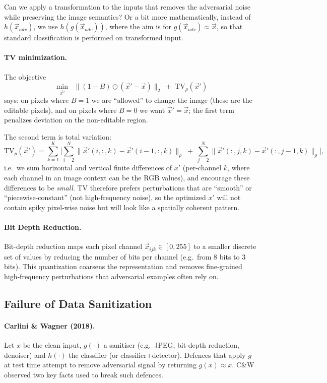 \documentclass[11pt]{report}
\begin{document}
Can we apply a transformation to the inputs that removes the adversarial noise while preserving the image semantics? Or a bit more mathematically, instead of $h(\vec{x}_{adv})$, we use $h(g(\vec{x}_{adv}))$, where the aim is for $g(\vec{x}_{adv}) \approx \vec{x}$, so that standard classification is performed on transformed input.

\paragraph{TV minimization.}
The objective
\[
\min_{\vec{x}'} \;\;\|(1-B)\odot(\vec{x}'-\vec{x})\|_2 \;+\; \mathrm{TV}_\rho(\vec{x}')
\]
says: on pixels where $B=1$ we are ``allowed'' to change the image (these are the editable pixels), and on pixels where $B=0$ we want $\vec{x}'=\vec{x}$; the first term penalizes deviation on the non-editable region.

\medskip
\noindent
The second term is total variation:
\[
\mathrm{TV}_p(\vec{x}')
=
\sum_{k=1}^K
\Bigg[
\sum_{i=2}^N\big\|\vec{x}'(i,:,k)-\vec{x}'(i-1,:,k)\big\|_\rho
\;+\;
\sum_{j=2}^N\big\|\vec{x}'(:,j,k)-\vec{x}'(:,j-1,k)\big\|_\rho
\Bigg],
\]
i.e.\ we sum horizontal and vertical finite differences of $x'$ (per-channel $k$, where each channel in an image context can be the RGB values), and encourage these differences to be \emph{small}.
TV therefore prefers perturbations that are ``smooth'' or ``piecewise-constant'' (not high-frequency noise), so the optimized $x'$ will not contain spiky pixel-wise noise but will look like a spatially coherent pattern.

\paragraph{Bit Depth Reduction.} Bit-depth reduction maps each pixel channel $\vec{x}_{ijk}\in[0,255]$ to a smaller discrete set of values by reducing the number of bits per channel (e.g.\ from $8$ bits to $3$ bits).  This quantization coarsens the representation and removes fine‐grained high‐frequency perturbations that adversarial examples often rely on.

\subsection*{Failure of Data Sanitization}

\paragraph{Carlini \& Wagner (2018).}
Let \(x\) be the clean input, \(g(\cdot)\) a sanitiser (e.g.\ JPEG, bit-depth reduction, denoiser) and \(h(\cdot)\) the classifier (or classifier+detector).  Defences that apply \(g\) at test time attempt to remove adversarial signal by returning \(g(x)\approx x\).  C\&W observed two key facts used to break such defences.
\end{document}

